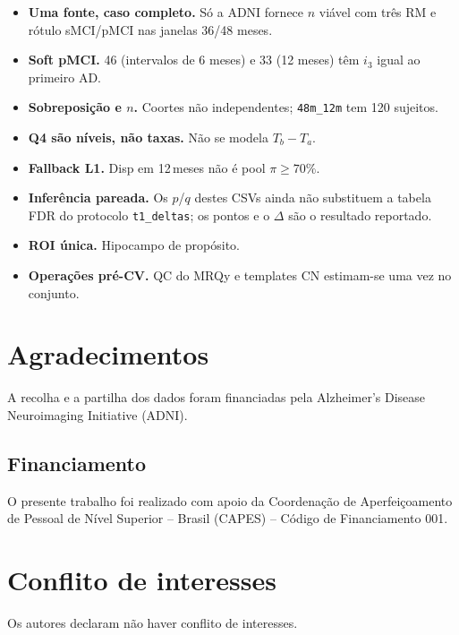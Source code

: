 \documentclass[review]{elsarticle}
\newcommand{\code}[1]{\texttt{#1}}
\begin{document}
\begin{itemize}
	\item \textbf{Uma fonte, caso completo.} Só a ADNI fornece $n$ viável com três RM e rótulo sMCI/pMCI nas janelas 36/48 meses.
	\item \textbf{Soft pMCI.} 46 (intervalos de 6 meses) e 33 (12 meses) têm $i_3$ igual ao primeiro AD.
	\item \textbf{Sobreposição e $n$.} Coortes não independentes; \code{48m\_12m} tem 120 sujeitos.
	\item \textbf{Q4 são níveis, não taxas.} Não se modela $T_b-T_a$.
	\item \textbf{Fallback L1.} Disp em 12\,meses não é pool $\pi\ge 70\%$.
	\item \textbf{Inferência pareada.} Os $p$/$q$ destes CSVs ainda não substituem a tabela FDR do protocolo \code{t1\_deltas}; os pontos e o $\Delta$ são o resultado reportado.
	\item \textbf{ROI única.} Hipocampo de propósito.
	\item \textbf{Operações pré-CV.} QC do MRQy e templates CN estimam-se uma vez no conjunto.
\end{itemize}

\section*{Agradecimentos}

A recolha e a partilha dos dados foram financiadas pela Alzheimer's Disease Neuroimaging Initiative (ADNI).

\subsection*{Financiamento}

O presente trabalho foi realizado com apoio da Coordenação de Aperfeiçoamento de Pessoal de Nível Superior -- Brasil (CAPES) -- Código de Financiamento 001.

\section*{Conflito de interesses}

Os autores declaram não haver conflito de interesses.



\end{document}
